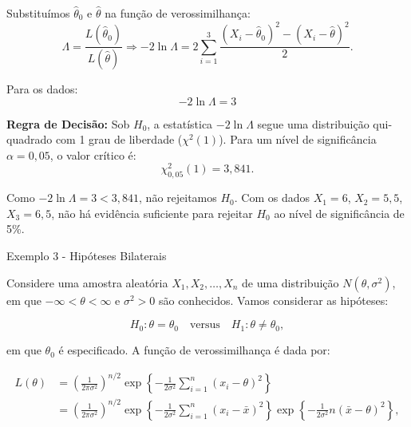 \documentclass[12pt]{beamer}
\begin{document}
\begin{frame}
	\begin{block}{}
Substituímos \(\hat{\theta}_0\) e \(\hat{\theta}\) na função de verossimilhança:
			\[
			\Lambda = \frac{L(\hat{\theta}_0)}{L(\hat{\theta})}\Rightarrow 
			-2 \ln \Lambda = 2 \sum_{i=1}^3 \frac{(X_i - \hat{\theta}_0)^2 - (X_i - \hat{\theta})^2}{2}.
			\]
			
			Para os dados:
			\[
			-2 \ln \Lambda = 3
			\]

	\end{block}
\end{frame}

\begin{frame}
	\begin{block}{}
		\justifying
\textbf{Regra de Decisão:} Sob \(H_0\), a estatística \(-2 \ln \Lambda\) segue uma distribuição qui-quadrado com 1 grau de liberdade (\(\chi^2(1)\)). Para um nível de significância \(\alpha = 0,05\), o valor crítico é:
			\[
			\chi^2_{0,05}(1) = 3,841.
			\]
			
			Como \(-2 \ln \Lambda = 3 < 3,841\), não rejeitamos \(H_0\). Com os dados \(X_1 = 6\), \(X_2 = 5,5\), \(X_3 = 6,5\), não há evidência suficiente para rejeitar \(H_0\) ao nível de significância de 5\%.	
	\end{block}
\end{frame}

\begin{frame}{Exemplo 3 - Hipóteses Bilaterais}
	\begin{block}{}
		\justifying
		Considere uma amostra aleatória $X_1, X_2, \ldots, X_n$ de uma distribuição $N(\theta, \sigma^2)$, em que $-\infty < \theta < \infty$ e $\sigma^2 > 0$ são conhecidos. Vamos considerar as hipóteses:
		
		\[ H_0 : \theta = \theta_0 \quad \text{versus} \quad H_1 : \theta \neq \theta_0, \]
		
		em que $\theta_0$ é especificado. A função de verossimilhança é dada por:
		
		
		\begin{align}
			L(\theta) &= \left(\frac{1}{2\pi\sigma^2}\right)^{n/2} \exp\left\{ -\frac{1}{2\sigma^2} \sum_{i=1}^{n}(x_i - \theta)^2 \right\} \\
			&= \left(\frac{1}{2\pi\sigma^2}\right)^{n/2} \exp\left\{ -\frac{1}{2\sigma^2} \sum_{i=1}^{n}(x_i - \bar{x})^2 \right\} \exp\left\{ -\frac{1}{2\sigma^2}n(\bar{x} - \theta)^2 \right\},
		\end{align}
		
	\end{block}
\end{frame}
\end{document}
